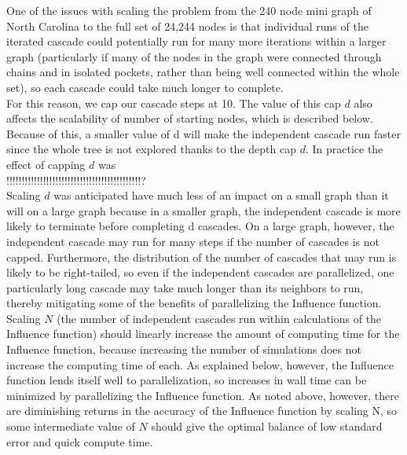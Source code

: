 \documentclass[11pt]{scrartcl} %
\begin{document}
One of the issues with scaling the problem from the 240 node mini graph of North Carolina to the full set of 24,244 nodes is that individual runs of the iterated cascade could potentially run for many more iterations within a larger graph (particularly if many of the nodes in the graph were connected through chains and in isolated pockets, rather than being well connected within the whole set), so each cascade could take much longer to complete.  \\

For this reason, we cap our cascade steps at 10.  The value of this cap $d$ also affects the scalability of number of starting nodes, which is described below.  Because of this, a smaller value of d will make the independent cascade run faster since the whole tree is not explored thanks to the depth cap $d$. In practice the effect of capping $d$ was\\
 !!!!!!!!!!!!!!!!!!!!!!!!!!!!!!!!!!!!!!!!!!!!?\\

Scaling $d$ was anticipated have much less of an impact on a small graph than it will on a large graph because in a smaller graph, the independent cascade is more likely to terminate before completing d cascades.  On a large graph, however, the independent cascade may run for many steps if the number of cascades is not capped.  Furthermore, the distribution of the number of cascades that may run is likely to be right-tailed, so even if the independent cascades are parallelized, one particularly long cascade may take much longer than its neighbors to run, thereby mitigating some of the benefits of parallelizing the Influence function.\\

Scaling $N$ (the number of independent cascades run within calculations of the Influence function) should linearly increase the amount of computing time for the Influence function, because increasing the number of simulations does not increase the computing time of each.  As explained below, however, the Influence function lends itself well to parallelization, so increases in wall time can be minimized by parallelizing the Influence function.  As noted above, however, there are diminishing returns in the accuracy of the Influence function by scaling N, so some intermediate value of $N$ should give the optimal balance of low standard error and quick compute time.\\
\end{document}

